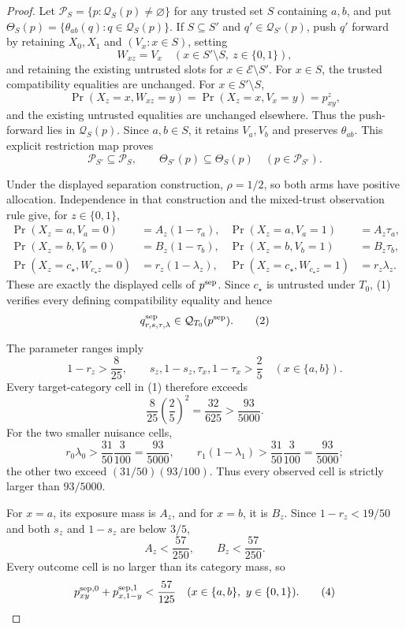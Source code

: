 \documentclass{article}
\begin{document}
\begin{proof}
Let \(\mathcal P_S=\{p:\mathcal Q_S(p)\ne\varnothing\}\) for any trusted
set \(S\) containing \(a,b\), and put
\(\Theta_S(p)=\{\theta_{ab}(q):q\in\mathcal Q_S(p)\}\).  If
\(S\subseteq S'\) and \(q'\in\mathcal Q_{S'}(p)\), push \(q'\) forward by
retaining \(X_0,X_1\) and \((V_x:x\in S)\), setting
\[
 W_{xz}=V_x\quad(x\in S'\setminus S,\ z\in\{0,1\}),
\]
and retaining the existing untrusted slots for
\(x\in\mathcal E\setminus S'\).  For \(x\in S\), the trusted compatibility
equalities are unchanged.  For \(x\in S'\setminus S\),
\[
 \Pr(X_z=x,W_{xz}=y)=\Pr(X_z=x,V_x=y)=p^z_{xy},
\]
and the existing untrusted equalities are unchanged elsewhere.  Thus the
push-forward lies in \(\mathcal Q_S(p)\).  Since \(a,b\in S\), it retains
\(V_a,V_b\) and preserves \(\theta_{ab}\).  This explicit restriction map
proves
\[
 \mathcal P_{S'}\subseteq\mathcal P_S,
 \qquad
 \Theta_{S'}(p)\subseteq\Theta_S(p)
 \quad(p\in\mathcal P_{S'}).
\]

Under the displayed separation construction,
\(\rho=1/2\), so both arms have positive allocation.  Independence in that
construction and the mixed-trust observation rule give, for
\(z\in\{0,1\}\),
\[
\begin{aligned}
 \Pr(X_z=a,V_a=0)&=A_z(1-\tau_a),&
 \Pr(X_z=a,V_a=1)&=A_z\tau_a,\\
 \Pr(X_z=b,V_b=0)&=B_z(1-\tau_b),&
 \Pr(X_z=b,V_b=1)&=B_z\tau_b,\\
 \Pr(X_z=c_\star,W_{c_\star z}=0)&=r_z(1-\lambda_z),&
 \Pr(X_z=c_\star,W_{c_\star z}=1)&=r_z\lambda_z.
\end{aligned} \tag{1}
\]
These are exactly the displayed cells of \(p^{\rm sep}\).  Since
\(c_\star\) is untrusted under \(T_0\), (1) verifies every defining
compatibility equality and hence
\[
 q^{\rm sep}_{r,s,\tau,\lambda}\in\mathcal Q_{T_0}(p^{\rm sep}). \tag{2}
\]

The parameter ranges imply
\[
 1-r_z>\frac8{25},
 \qquad s_z,1-s_z,\tau_x,1-\tau_x>\frac25
 \quad(x\in\{a,b\}).
\]
Every target-category cell in (1) therefore exceeds
\[
 \frac8{25}\left(\frac25\right)^2
 =\frac{32}{625}>\frac{93}{5000}. \tag{3}
\]
For the two smaller nuisance cells,
\[
 r_0\lambda_0>\frac{31}{50}\frac3{100}=\frac{93}{5000},
 \qquad
 r_1(1-\lambda_1)>\frac{31}{50}\frac3{100}=\frac{93}{5000};
\]
the other two exceed \((31/50)(93/100)\).  Thus every observed cell is
strictly larger than \(93/5000\).

For \(x=a\), its exposure mass is \(A_z\), and for \(x=b\), it is \(B_z\).
Since \(1-r_z<19/50\) and both \(s_z\) and \(1-s_z\) are below \(3/5\),
\[
 A_z<\frac{57}{250},\qquad B_z<\frac{57}{250}.
\]
Every outcome cell is no larger than its category mass, so
\[
 p^{{\rm sep},0}_{xy}+p^{{\rm sep},1}_{x,1-y}
 <\frac{57}{125}
 \quad(x\in\{a,b\},\ y\in\{0,1\}). \tag{4}
\]


\end{proof}
\end{document}
